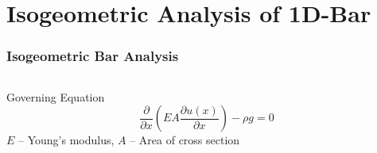 \documentclass{beamer}
\newcommand{\pd}[2]{\frac{\partial #1}{\partial #2}}
\begin{document}
\section{Isogeometric Analysis of 1D-Bar}
\begin{frame}[allowframebreaks] \frametitle{Isogeometric Bar Analysis}

  \begin{columns}
  \begin{column}[b]{0.78\linewidth}
  \begin{block}{Governing Equation}
    \begin{equation}\nonumber
      \pd{}{x} \left( EA \pd{u(x)}{x} \right) - \rho g  = 0
    \end{equation}
    $E$ -- Young's modulus, $A$ -- Area of cross section
  \end{block}
  

\end{column}
\end{columns}
\end{frame}
\end{document}

